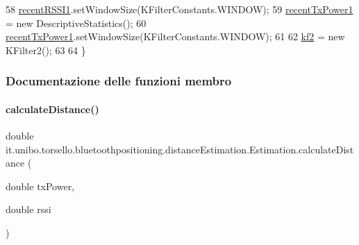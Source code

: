 \begin{DoxyCode}
58         \hyperlink{classit_1_1unibo_1_1torsello_1_1bluetoothpositioning_1_1distanceEstimation_1_1Estimation_aacf81521c24139272119b38103a2272f_aacf81521c24139272119b38103a2272f}{recentRSSI1}.setWindowSize(KFilterConstants.WINDOW);
59         \hyperlink{classit_1_1unibo_1_1torsello_1_1bluetoothpositioning_1_1distanceEstimation_1_1Estimation_a1b2b8296a7feaddba403fbdf62b65c04_a1b2b8296a7feaddba403fbdf62b65c04}{recentTxPower1} = \textcolor{keyword}{new} DescriptiveStatistics();
60         \hyperlink{classit_1_1unibo_1_1torsello_1_1bluetoothpositioning_1_1distanceEstimation_1_1Estimation_a1b2b8296a7feaddba403fbdf62b65c04_a1b2b8296a7feaddba403fbdf62b65c04}{recentTxPower1}.setWindowSize(KFilterConstants.WINDOW);
61 
62         \hyperlink{classit_1_1unibo_1_1torsello_1_1bluetoothpositioning_1_1distanceEstimation_1_1Estimation_a1d085f6c0d1ac7db6c60fb20ae3a6475_a1d085f6c0d1ac7db6c60fb20ae3a6475}{kf2} = \textcolor{keyword}{new} KFilter2();
63 
64     \}
\end{DoxyCode}


\subsubsection{Documentazione delle funzioni membro}
\hypertarget{classit_1_1unibo_1_1torsello_1_1bluetoothpositioning_1_1distanceEstimation_1_1Estimation_a6e33d4e0b776517a86c6aa87cd51b66b_a6e33d4e0b776517a86c6aa87cd51b66b}{}\label{classit_1_1unibo_1_1torsello_1_1bluetoothpositioning_1_1distanceEstimation_1_1Estimation_a6e33d4e0b776517a86c6aa87cd51b66b_a6e33d4e0b776517a86c6aa87cd51b66b} 
\paragraph{\texorpdfstring{calculate\+Distance()}{calculateDistance()}}
{\footnotesize\ttfamily double it.\+unibo.\+torsello.\+bluetoothpositioning.\+distance\+Estimation.\+Estimation.\+calculate\+Distance (\begin{DoxyParamCaption}\item[{double}]{tx\+Power,  }\item[{double}]{rssi }\end{DoxyParamCaption})\hspace{0.3cm}{\ttfamily [private]}}


